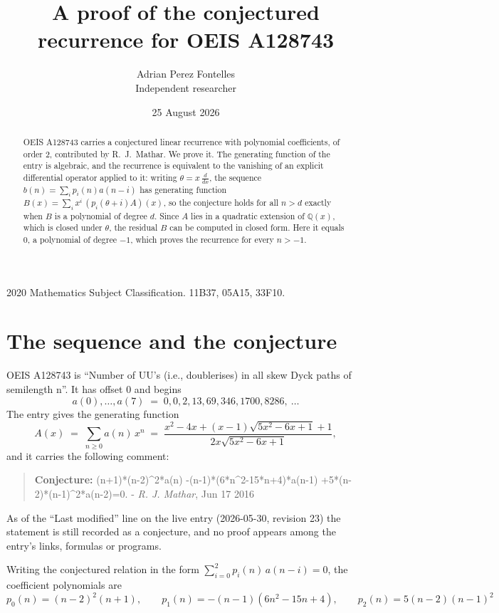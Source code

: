 \documentclass[11pt,a4paper]{article}
\title{A proof of the conjectured recurrence for OEIS A128743}
\author{Adrian Perez Fontelles\\ \small Independent researcher}
\date{25 August 2026}
\theoremstyle{plain}
\theoremstyle{definition}
\begin{document}
\maketitle

\begin{abstract}
OEIS A128743 carries a conjectured linear recurrence with polynomial coefficients, of
order 2, contributed by R.~J.~Mathar. We prove it. The generating function of the
entry is algebraic, and the recurrence is equivalent to the vanishing of an explicit
differential operator applied to it: writing $\theta=x\,\frac{d}{dx}$, the sequence
$b(n)=\sum_{i}p_{i}(n)a(n-i)$ has generating function
$B(x)=\sum_{i}x^{i}\,(p_{i}(\theta+i)A)(x)$, so the conjecture holds for all $n>d$ exactly
when $B$ is a polynomial of degree $d$. Since $A$ lies in a quadratic extension of
$\mathbb{Q}(x)$, which is closed under $\theta$, the residual $B$ can be computed in
closed form. Here it equals $0$, a polynomial of degree $-1$, which proves
the recurrence for every $n>-1$.
\end{abstract}

\noindent\small 2020 Mathematics Subject Classification. 11B37, 05A15, 33F10.\normalsize

\section{The sequence and the conjecture}

OEIS A128743 is ``Number of UU's (i.e., doublerises) in all skew Dyck paths of semilength n''. It has offset $0$ and begins
\[
a(0),\dots,a(7)\;=\;0, 0, 2, 13, 69, 346, 1700, 8286,\ \dots
\]
The entry gives the generating function
\begin{equation}\label{eq:gf}
A(x)\;=\;\sum_{n\ge 0} a(n)\,x^{n}\;=\;\frac{x^{2} - 4 x + \left(x - 1\right) \sqrt{5 x^{2} - 6 x + 1} + 1}{2 x \sqrt{5 x^{2} - 6 x + 1}} ,
\end{equation}
and it carries the following comment:
\begin{quote}\small
\textbf{Conjecture:} (n+1)*(n-2)\^{}2*a(n) -(n-1)*(6*n\^{}2-15*n+4)*a(n-1) +5*(n-2)*(n-1)\^{}2*a(n-2)=0. - \emph{R. J. Mathar}, Jun 17 2016
\end{quote}
As of the ``Last modified'' line on the live entry (2026-05-30, revision 23) the
statement is still recorded as a conjecture, and no proof appears among the entry's links,
formulas or programs.

Writing the conjectured relation in the form $\sum_{i=0}^{2}p_{i}(n)\,a(n-i)=0$,
the coefficient polynomials are
\[
p_{0}(n)=\left(n - 2\right)^{2} \left(n + 1\right),\qquad p_{1}(n)=- \left(n - 1\right) \left(6 n^{2} - 15 n + 4\right),\qquad p_{2}(n)=5 \left(n - 2\right) \left(n - 1\right)^{2}
\]
\end{document}
